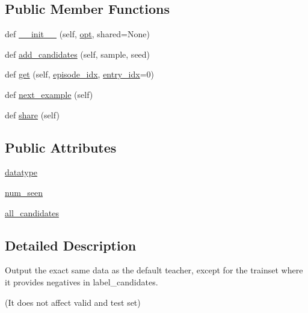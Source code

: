 \subsection*{Public Member Functions}
\begin{DoxyCompactItemize}
\item 
def \hyperlink{classparlai_1_1tasks_1_1ubuntu_1_1agents_1_1UbuntuTeacherWithNegs_a10a49844810d11e7aecf4b7854c81787}{\+\_\+\+\_\+init\+\_\+\+\_\+} (self, \hyperlink{classparlai_1_1core_1_1agents_1_1Teacher_a3ce6243860ce978a897922863ed32fa4}{opt}, shared=None)
\item 
def \hyperlink{classparlai_1_1tasks_1_1ubuntu_1_1agents_1_1UbuntuTeacherWithNegs_aca16cfaf6d38cfc93ace8445811863c3}{add\+\_\+candidates} (self, sample, seed)
\item 
def \hyperlink{classparlai_1_1tasks_1_1ubuntu_1_1agents_1_1UbuntuTeacherWithNegs_a47304c2339835e7942ae190d4b17fc2d}{get} (self, \hyperlink{classparlai_1_1core_1_1teachers_1_1FixedDialogTeacher_afd4ebab8063eb42d182d30a1a41f133e}{episode\+\_\+idx}, \hyperlink{classparlai_1_1core_1_1teachers_1_1FixedDialogTeacher_ae3201b15f3c3b46a2f3511bad9b43e7d}{entry\+\_\+idx}=0)
\item 
def \hyperlink{classparlai_1_1tasks_1_1ubuntu_1_1agents_1_1UbuntuTeacherWithNegs_aef77d69155c1215eb64ec5c1ba895bdf}{next\+\_\+example} (self)
\item 
def \hyperlink{classparlai_1_1tasks_1_1ubuntu_1_1agents_1_1UbuntuTeacherWithNegs_aacac8ac1f8b79287b943b85ed21b081b}{share} (self)
\end{DoxyCompactItemize}
\subsection*{Public Attributes}
\begin{DoxyCompactItemize}
\item 
\hyperlink{classparlai_1_1tasks_1_1ubuntu_1_1agents_1_1UbuntuTeacherWithNegs_a93d31fab305d4b58d377ea9e6d5b7e39}{datatype}
\item 
\hyperlink{classparlai_1_1tasks_1_1ubuntu_1_1agents_1_1UbuntuTeacherWithNegs_a66c8920874a95611d27a7d5b21c1c128}{num\+\_\+seen}
\item 
\hyperlink{classparlai_1_1tasks_1_1ubuntu_1_1agents_1_1UbuntuTeacherWithNegs_ab4625f39fc5003fb1ea94be95c8e8ef9}{all\+\_\+candidates}
\end{DoxyCompactItemize}


\subsection{Detailed Description}
\begin{DoxyVerb}Output the exact same data as the default teacher, except for the trainset where it
provides negatives in label_candidates.

(It does not affect valid and test set)
\end{DoxyVerb}
 

